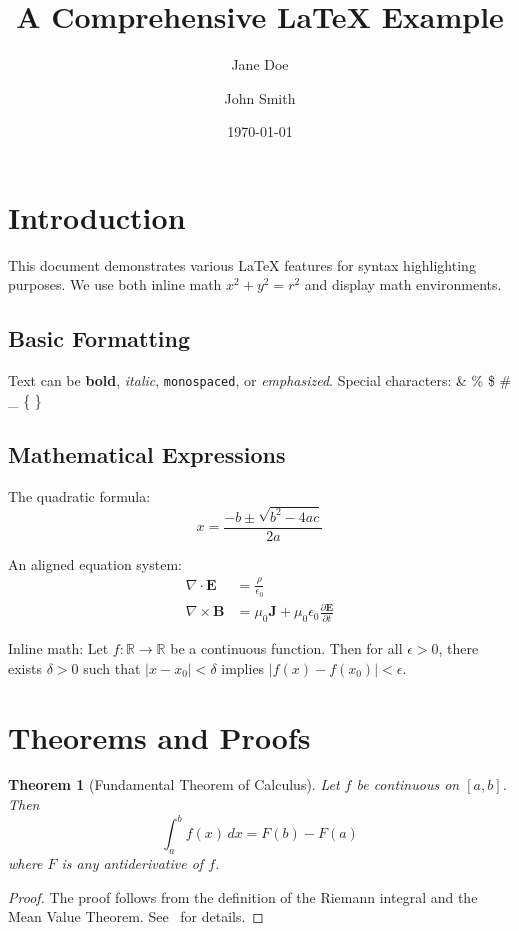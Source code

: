\documentclass[12pt,a4paper]{article}
\title{A Comprehensive \LaTeX{} Example}
\author{Jane Doe \and John Smith}
\date{\today}
\newcommand{\R}{\mathbb{R}}
\renewcommand{\vec}[1]{\boldsymbol{#1}}
\newtheorem{theorem}{Theorem}[section]
\begin{document}
\maketitle
\tableofcontents

\section{Introduction}

This document demonstrates various \LaTeX{} features for syntax
highlighting purposes. We use both inline math $x^2 + y^2 = r^2$
and display math environments.

\subsection{Basic Formatting}

Text can be \textbf{bold}, \textit{italic}, \texttt{monospaced},
or \emph{emphasized}. Special characters: \& \% \$ \# \_ \{ \}

\subsection*{Mathematical Expressions}

The quadratic formula:
$$x = \frac{-b \pm \sqrt{b^2 - 4ac}}{2a}$$

An aligned equation system:
\begin{align}
    \nabla \cdot \vec{E} &= \frac{\rho}{\epsilon_0} \label{eq:gauss} \\
    \nabla \times \vec{B} &= \mu_0 \vec{J} + \mu_0 \epsilon_0 \frac{\partial \vec{E}}{\partial t}
\end{align}

Inline math: Let $f: \R \to \R$ be a continuous function. Then for
all $\epsilon > 0$, there exists $\delta > 0$ such that
$|x - x_0| < \delta$ implies $|f(x) - f(x_0)| < \epsilon$.

\section{Theorems and Proofs}

\begin{theorem}[Fundamental Theorem of Calculus]
    Let $f$ be continuous on $[a, b]$. Then
    \[
        \int_a^b f(x) \, dx = F(b) - F(a)
    \]
    where $F$ is any antiderivative of $f$.
\end{theorem}

\begin{proof}
    The proof follows from the definition of the Riemann integral
    and the Mean Value Theorem. See~\cite{rudin1976} for details.
\end{proof}
\end{document}
